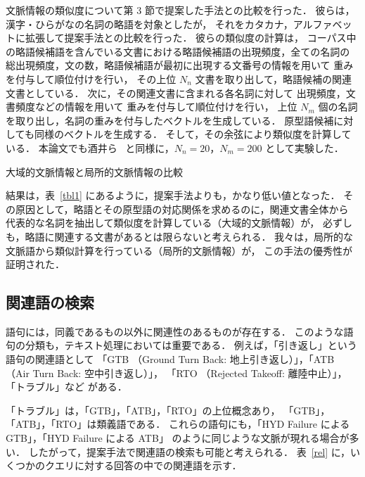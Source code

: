 \documentclass[japanese]{jnlp_1.4}
\begin{document}
文脈情報の類似度について第 3 節で提案した手法との比較を行った．
彼らは，漢字・ひらがなの名詞の略語を対象としたが，
それをカタカナ，アルファベットに拡張して提案手法との比較を行った．
彼らの類似度の計算は，
コーパス中の略語候補語を含んでいる文書における略語候補語の出現頻度，全ての名詞の
総出現頻度，文の数，略語候補語が最初に出現する文番号の情報を用いて
重みを付与して順位付けを行い，
その上位 $N_{n}$ 文書を取り出して，略語候補の関連文書としている．
次に，その関連文書に含まれる各名詞に対して
出現頻度，文書頻度などの情報を用いて
重みを付与して順位付けを行い，
上位 $N_{m}$ 個の名詞を取り出し，名詞の重みを付与したベクトルを生成している．
原型語候補に対しても同様のベクトルを生成する．
そして，その余弦により類似度を計算している．
本論文でも酒井ら~\cite{sakai05} と同様に，$N_{n}=20$，$N_{m}=200$ として実験した．

\begin{table}[t]
\begin{center}
\caption{大域的文脈情報と局所的文脈情報の比較}
\label{tbl1}

\end{center}
\end{table}

結果は，表~\ref{tbl1} にあるように，提案手法よりも，かなり低い値となった．
その原因として，略語とその原型語の対応関係を求めるのに，関連文書全体から
代表的な名詞を抽出して類似度を計算している（大域的文脈情報）が，
必ずしも，略語に関連する文書があるとは限らないと考えられる．
我々は，局所的な文脈語から類似計算を行っている（局所的文脈情報）が，
この手法の優秀性が証明された．



\subsection{関連語の検索}

語句には，同義であるもの以外に関連性のあるものが存在する．
このような語句の分類も，テキスト処理においては重要である．
例えば，「引き返し」という語句の関連語として
「GTB （Ground Turn Back: 地上引き返し）」，「ATB （Air Turn Back: 空中引き返し）」，
「RTO （Rejected Takeoff: 離陸中止）」，「トラブル」など
がある．

「トラブル」は，「GTB」，「ATB」，「RTO」の上位概念あり，
「GTB」，「ATB」，「RTO」は類義語である．
これらの語句にも，「HYD Failure による GTB」，「HYD Failure による ATB」
のように同じような文脈が現れる場合が多い．
したがって，提案手法で関連語の検索も可能と考えられる．
表~\ref{rel} に，いくつかのクエリに対する回答の中での関連語を示す．
\end{document}
